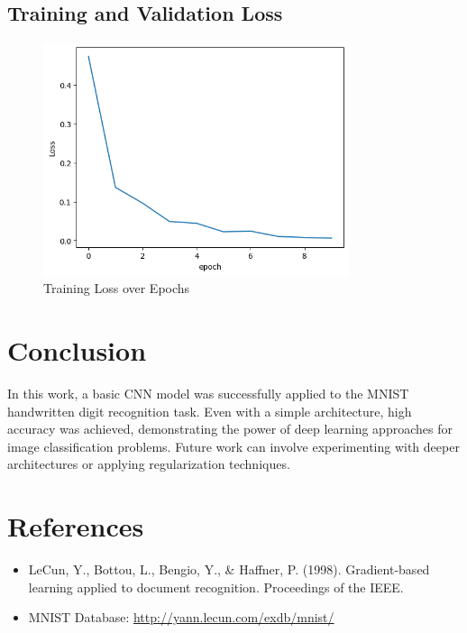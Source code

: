 \documentclass[12pt]{article}
\begin{document}
\subsection{Training and Validation Loss}
\begin{figure}[H]
    \centering
    \includegraphics[width=0.8\textwidth]{output.png}
    \caption{Training Loss over Epochs}
\end{figure}

\section{Conclusion}
In this work, a basic CNN model was successfully applied to the MNIST handwritten digit recognition task. Even with a simple architecture, high accuracy was achieved, demonstrating the power of deep learning approaches for image classification problems. Future work can involve experimenting with deeper architectures or applying regularization techniques.

\section{References}
\begin{itemize}
    \item LeCun, Y., Bottou, L., Bengio, Y., \& Haffner, P. (1998). Gradient-based learning applied to document recognition. Proceedings of the IEEE.
    \item MNIST Database: \url{http://yann.lecun.com/exdb/mnist/}
\end{itemize}
\end{document}
